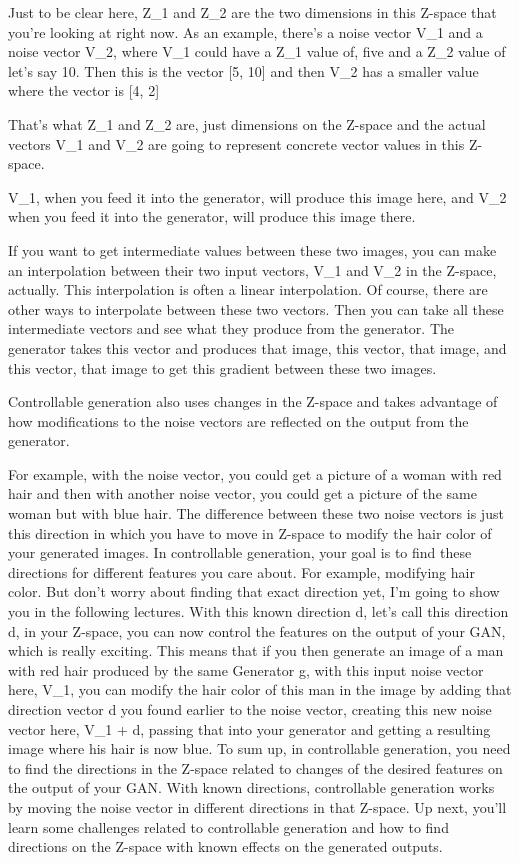 \documentclass[11pt, onecolumn]{article}
\begin{document}
Just to be clear here, Z_1 and Z_2 are the two dimensions in this Z-space that you're looking at right now.
As an example, there's a noise vector V_1 and a noise vector V_2, where V_1 could have a Z_1 value of, five and a Z_2 value of let's say 10. Then this is the vector [5, 10] and then V_2 has a smaller value where the vector is [4, 2]

That's what Z_1 and Z_2 are, just dimensions on the Z-space and the actual vectors V_1 and V_2 are going to represent concrete vector values in this Z-space.

V_1, when you feed it into the generator, will produce this image here, and V_2 when you feed it into the generator, will produce this image there.

If you want to get intermediate values between these two images, you can make an interpolation between their two input vectors, V_1 and V_2 in the Z-space, actually.
This interpolation is often a linear interpolation.
Of course, there are other ways to
interpolate between these two vectors.
Then you can take all these intermediate vectors
and see what they produce from the generator.
The generator takes this vector and
produces that image, this vector,
that image, and this vector,
that image to get this gradient between these two images.

Controllable generation also uses changes in the Z-space and takes advantage of how modifications to the noise vectors are reflected on the output from the generator.

For example, with the noise vector,
you could get a picture of a woman with
red hair and then with another noise vector,
you could get a picture of the same
woman but with blue hair.
The difference between these two noise vectors
is just this direction in which you have to
move in Z-space to
modify the hair color of your generated images.
In controllable generation, your goal is to find
these directions for different features you care about.
For example, modifying hair color.
But don't worry about finding that exact direction yet,
I'm going to show you in the following lectures.
With this known direction d,
let's call this direction d,
in your Z-space, you can now
control the features on the output of your GAN,
which is really exciting.
This means that if you then generate an image of
a man with red hair produced by the same Generator g,
with this input noise vector here, V_1,
you can modify the hair color of
this man in the image by adding
that direction vector d you
found earlier to the noise vector,
creating this new noise vector here, V_1 + d,
passing that into your generator and
getting a resulting image where his hair is now blue.
To sum up, in controllable generation,
you need to find the directions in the Z-space related to
changes of the desired features
on the output of your GAN.
With known directions,
controllable generation works by moving
the noise vector in different directions in that Z-space.
Up next, you'll learn
some challenges related to controllable generation and
how to find directions on the Z-space with
known effects on the generated outputs. 
\end{document}
